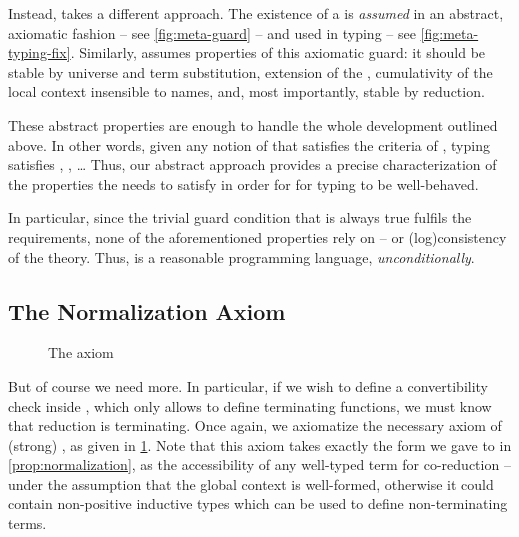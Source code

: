 Instead,  takes a different approach. The existence of a  is
\emph{assumed} in an abstract, axiomatic fashion – see \cref{fig:meta-guard} –
and used in typing – see \cref{fig:meta-typing-fix}.
Similarly,  assumes properties of this axiomatic guard: it
should be stable by universe and term substitution, extension of the ,
cumulativity of the local context insensible to names, and, most importantly, stable by
reduction.

These abstract properties are enough to handle the whole development outlined above. In other
words, given any notion of  that satisfies the criteria of
, typing satisfies ,
, … Thus, our abstract approach provides a precise
characterization of the properties the  needs to satisfy in order for
for typing to be well-behaved.

In particular, since the trivial guard condition
that is always true fulfils the requirements, none of the aforementioned
properties rely on  – or \kl(log){consistency} of the theory.
Thus,  is a reasonable programming language, \emph{unconditionally}.

\subsection{The Normalization Axiom}

\begin{figure}[h]
  \caption{The  axiom}
  \label{fig:meta-sn}
\end{figure}

But of course we need more. In particular, if we wish to define a convertibility check
inside , which only allows to define terminating functions,
we must know that reduction is terminating. Once again, we axiomatize the necessary
axiom of (strong) , as given in \cref{fig:meta-sn}.
Note that this axiom takes exactly the form we gave to 
in \cref{prop:normalization}, as the accessibility of any well-typed term for
co-reduction – under the assumption that the global context is well-formed, otherwise
it could contain \eg non-positive inductive types which can be used to define non-terminating terms.


